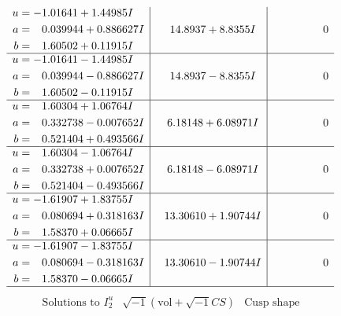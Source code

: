 \documentclass[1p]{elsarticle_modified}
\theoremstyle{definition}
\newcommand{\I}{\sqrt{-1}}
\begin{document}
$$\begin{array}{c|c|c}
\begin{aligned}
u &= -1.01641 + 1.44985 I \\
a &= \phantom{-}0.039944 + 0.886627 I \\
b &= \phantom{-}1.60502 + 0.11915 I\end{aligned}
 & \phantom{-}14.8937 + 8.8355 I & \phantom{-0.000000 } 0 \\ \hline\begin{aligned}
u &= -1.01641 - 1.44985 I \\
a &= \phantom{-}0.039944 - 0.886627 I \\
b &= \phantom{-}1.60502 - 0.11915 I\end{aligned}
 & \phantom{-}14.8937 - 8.8355 I & \phantom{-0.000000 } 0 \\ \hline\begin{aligned}
u &= \phantom{-}1.60304 + 1.06764 I \\
a &= \phantom{-}0.332738 - 0.007652 I \\
b &= \phantom{-}0.521404 + 0.493566 I\end{aligned}
 & \phantom{-}6.18148 + 6.08971 I & \phantom{-0.000000 } 0 \\ \hline\begin{aligned}
u &= \phantom{-}1.60304 - 1.06764 I \\
a &= \phantom{-}0.332738 + 0.007652 I \\
b &= \phantom{-}0.521404 - 0.493566 I\end{aligned}
 & \phantom{-}6.18148 - 6.08971 I & \phantom{-0.000000 } 0 \\ \hline\begin{aligned}
u &= -1.61907 + 1.83755 I \\
a &= \phantom{-}0.080694 + 0.318163 I \\
b &= \phantom{-}1.58370 + 0.06665 I\end{aligned}
 & \phantom{-}13.30610 + 1.90744 I & \phantom{-0.000000 } 0 \\ \hline\begin{aligned}
u &= -1.61907 - 1.83755 I \\
a &= \phantom{-}0.080694 - 0.318163 I \\
b &= \phantom{-}1.58370 - 0.06665 I\end{aligned}
 & \phantom{-}13.30610 - 1.90744 I & \phantom{-0.000000 } 0\\
 \hline 
 \end{array}$$\newpage$$\begin{array}{c|c|c}  
\text{Solutions to }I^u_{2}& \I (\text{vol} + \sqrt{-1}CS) & \text{Cusp shape}\\

\end{array}$$
\end{document}
